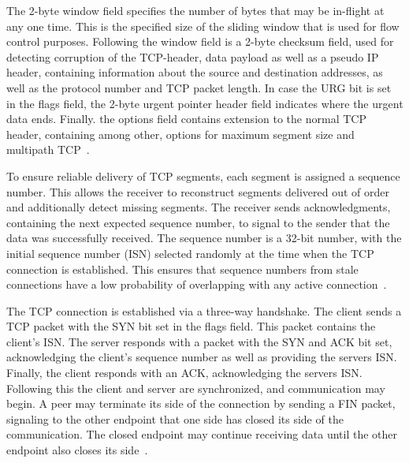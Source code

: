 \documentclass[english, 12pt, a4paper, elec, utf8, a-2b, online]{aaltothesis}
\begin{document}
The 2-byte window field specifies the number of bytes that may be in-flight at any one
time. This is the specified size of the sliding window that is used for flow
control purposes. Following the window field is a 2-byte checksum field, used for
detecting corruption of the TCP-header, data payload as well as a pseudo IP header,
containing information about the source and destination addresses, as well as the
protocol number and TCP packet length. In case the URG bit is set in the flags field,
the 2-byte urgent pointer header field indicates where the urgent data ends. Finally.
the options field contains extension to the normal TCP header, containing among other, options
for maximum segment size and multipath TCP~\cite{rfc8684}.

To ensure reliable delivery of TCP segments, each segment is assigned a sequence number.
This allows the receiver to reconstruct segments delivered out of order and additionally
detect missing segments. The receiver sends acknowledgments, containing the next expected
sequence number, to signal to the sender that the data was successfully received.
The sequence number is a 32-bit number, with the initial sequence number (ISN)
selected randomly at the time when the TCP connection is established. This ensures that
sequence numbers from stale connections have a low probability of overlapping with
any active connection~\cite{rfc793}.

The TCP connection is established via a three-way handshake. The client sends
a TCP packet with the SYN bit set in the flags field. This packet contains the
client's ISN. The server responds with a packet with the SYN and ACK bit set,
acknowledging the client's sequence number as well as providing the servers ISN.
Finally, the client responds with an ACK, acknowledging the servers ISN. Following
this the client and server are synchronized, and communication may begin. A peer
may terminate its side of the connection by sending a FIN packet, signaling to
the other endpoint that one side has closed its side of the communication. The
closed endpoint may continue receiving data until the other endpoint also closes
its side~\cite{rfc793}.
\end{document}
